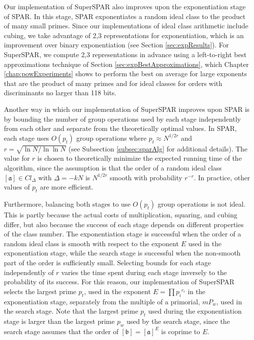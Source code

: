 \documentclass{ucalgthes1}
\theoremstyle{definition}
\newcommand{\ideal}{\mathfrak}
\newcommand{\idealclass}[1]{\left[ \ideal #1 \right]}
\newcommand{\aclass}{\idealclass a}
\newcommand{\bclass}{\idealclass b}
\begin{document}
Our implementation of SuperSPAR also improves upon the exponentiation stage of SPAR.  In this stage, SPAR exponentiates a random ideal class to the product of many small primes.  Since our implementations of ideal class arithmetic include cubing, we take advantage of 2,3 representations for exponentiation, which is an improvement over binary exponentiation (see Section \ref{sec:expResults}).  For SuperSPAR, we compute 2,3 representations in advance using a left-to-right best approximations technique of Section \ref{sec:expBestApproximations}, which Chapter \ref{chap:powExperiments} shows to perform the best on average for large exponents that are the product of many primes and for ideal classes for orders with discriminants no larger than 118 bits.

Another way in which our implementation of SuperSPAR improves upon SPAR is by bounding the number of group operations used by each stage independently from each other and separate from the theoretically optimal values.  In SPAR, each stage uses $O(p_t)$ group operations where $p_t \approx N^{1/2r}$ and $r = \sqrt{\ln N / \ln \ln N}$ (see Subsection \ref{subsec:sparAlg} for additional details).  The value for $r$ is chosen to theoretically minimize the expected running time of the algorithm, since the assumption is that the order of a random ideal class $\aclass \in Cl_\Delta$ with $\Delta = -kN$ is $N^{1/2r}$ smooth with probability $r^{-r}$.  In practice, other values of $p_t$ are more efficient.  

Furthermore, balancing both stages to use $O(p_t)$ group operations is not ideal.  This is partly because the actual costs of multiplication, squaring, and cubing differ, but also because the success of each stage depends on different properties of the class number.  The exponentiation stage is successful when the order of a random ideal class is smooth with respect to the exponent $E$ used in the exponentiation stage, while the search stage is successful when the non-smooth part of the order is sufficiently small.  Selecting bounds for each stage independently of $r$ varies the time spent during each stage inversely to the probability of its success.  For this reason, our implementation of SuperSPAR selects the largest prime $p_t$, used in the exponent $E = \prod {p_i}^{e_i}$ in the exponentiation stage, separately from the multiple of a primorial, $mP_w$, used in the search stage.  Note that the largest prime $p_t$ used during the exponentiation stage is larger than the largest prime $p_w$ used by the search stage, since the search stage assumes that the order of $\bclass = \aclass^E$ is coprime to $E$.
\end{document}
